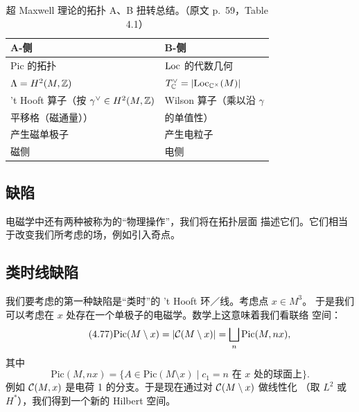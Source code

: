 \begin{table}[htbp]
  \centering
  \caption{超 Maxwell 理论的拓扑 A、B 扭转总结。（原文 p.~59，Table 4.1）}
  \label{tab:4-1}
  \small
  \begin{tabular}{ll}
    \toprule
    A-侧 & B-侧\\
    \midrule
    $\mathrm{Pic}$ 的拓扑 & $\mathrm{Loc}$ 的代数几何\\
    $\Lambda=H^{2}(M,\mathbb{Z})$ & $T^{\vee}_{\mathbb{C}}=|\mathrm{Loc}_{\mathbb{C}^{\times}}(M)|$\\
    't Hooft 算子（按 $\gamma^{\vee}\in H^{2}(M,\mathbb{Z})$ & Wilson 算子（乘以沿 $\gamma$\\
    \quad 平移格（磁通量）） & \quad 的单值性）\\
    产生磁单极子 & 产生电粒子\\
    磁侧 & 电侧\\
    \bottomrule
  \end{tabular}
\end{table}


\subsection{缺陷}
\label{sec:4-8-2}

电磁学中还有两种被称为的“物理操作”，我们将在拓扑层面
描述它们。它们相当于改变我们所考虑的场，例如引入奇点。

\subsection*{类时线缺陷}

我们要考虑的第一种缺陷是“类时”的 't Hooft 环／线。考虑点 $x\in M^{3}$。
于是我们可以考虑在 $x$ 处存在一个单极子的电磁学。数学上这意味着我们看联络
空间：
\begin{equation}\tag{4.77}
\mathrm{Pic}(M\setminus x)=|\mathcal{C}(M\setminus x)|=\bigsqcup_{n}\mathrm{Pic}(M,nx),
\end{equation}
其中
\begin{equation}\tag{4.78}
\mathrm{Pic}(M,nx)=\{A\in\mathrm{Pic}(M\setminus x)\mid c_{1}=n\text{ 在 }x\text{ 处的球面上}\}.
\end{equation}
例如 $\mathcal{C}(M,x)$ 是电荷 1 的分支。于是现在通过对 $\mathcal{C}(M\setminus x)$ 做线性化
（取 $L^{2}$ 或 $H^{*}$），我们得到一个新的 Hilbert 空间。

